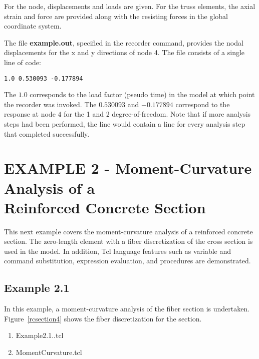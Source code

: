\documentclass[12pt]{article}
\begin{document}
For the node, displacements and loads are given.  For the truss
elements, the axial strain and force are provided along with the 
resisting forces in the global coordinate system.


The file {\bf example.out}, specified in the recorder command, provides the nodal 
displacements for the x and y directions of node 4. The file consists of a single line of code:
\vspace{0.2in} 

{\sf\small
\begin{verbatim}
1.0 0.530093 -0.177894 
\end{verbatim}
}

The $1.0$ corresponds to the load factor (pseudo time) in the model at which point 
the recorder was invoked. The $0.530093$ and $-0.177894$ correspond to the response
at node $4$ for the 1 and 2 degree-of-freedom. Note that if more analysis steps had been 
performed, the line would contain a line for every analysis step that completed successfully.

\pagebreak
\section{EXAMPLE 2 - Moment-Curvature Analysis of a \\ 
Reinforced Concrete Section} 

This next example covers the moment-curvature analysis of a reinforced 
concrete section. The zero-length element with a fiber discretization
of the cross section is used in the model. In addition, Tcl language 
features such as variable and command substitution, expression
evaluation, and procedures are demonstrated.

\subsection{Example 2.1}
In this example, a moment-curvature analysis of the fiber
section is undertaken. Figure~\ref{rcsection4}
shows the fiber discretization for the section.

\vspace{0.2in}  
\begin{enumerate} 
\item Example2.1..tcl
\item MomentCurvature.tcl
\end{enumerate}

\vspace{0.2in} 
\end{document}

